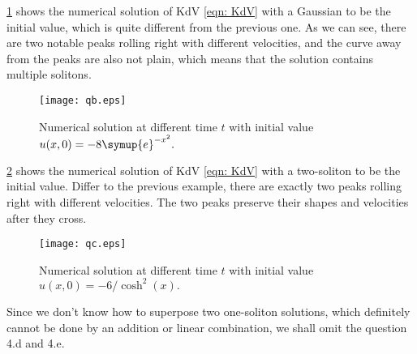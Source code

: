 \documentclass{assignment}[2019/10/15]
\newcommand{\me}{\symup{e}}
\begin{document}
    \ref{fig: qb} shows the numerical solution of KdV \ref{eqn: KdV} with a Gaussian to be the initial value, which is quite different from the previous one. As we can see, there are two notable peaks rolling right with different velocities, and the curve away from the peaks are also not plain, which means that the solution contains multiple solitons.

    \begin{figure}[htb]
        \centering
        \texttt{[image: qb.eps]}
        \caption{Numerical solution at different time $t$ with initial value $u(x, 0) = -8\me^{-x^2}.$}
        \label{fig: qb}
    \end{figure}

    \ref{fig: qc} shows the numerical solution of KdV \ref{eqn: KdV} with a two-soliton to be the initial value. Differ to the previous example, there are exactly two peaks rolling right with different velocities. The two peaks preserve their shapes and velocities after they cross.

    \begin{figure}[htb]
        \centering
        \texttt{[image: qc.eps]}
        \caption{Numerical solution at different time $t$ with initial value $u(x, 0) = -6/\cosh^2(x).$}
        \label{fig: qc}
    \end{figure}

    Since we don't know how to superpose two one-soliton solutions, which definitely cannot be done by an addition or linear combination, we shall omit the question 4.d and 4.e.

    \clearpage
    \appendix



\end{document}

